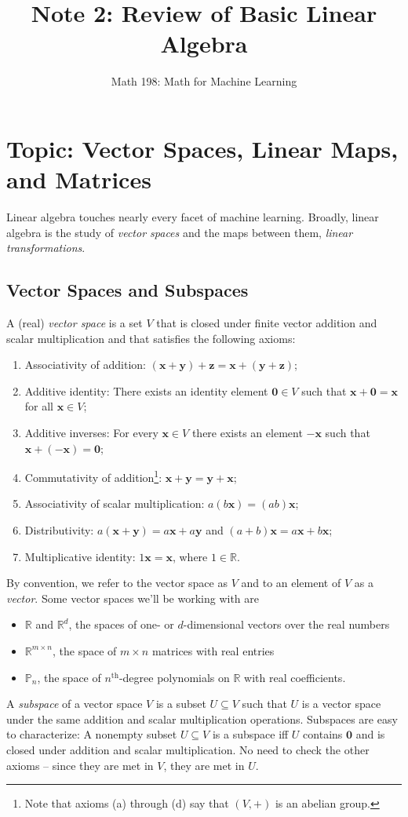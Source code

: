 \documentclass{article}
\title{Note 2: Review of Basic Linear Algebra}
\author{Math 198: Math for Machine Learning}
\date{}
\newcommand{\R}{\mathbb{R}}
\newcommand{\tit}{\textit}
\newcommand{\tbf}{\textbf}
\begin{document}
\maketitle

\section{Topic: Vector Spaces, Linear Maps, and Matrices}
Linear algebra touches nearly every facet of machine learning. Broadly, linear algebra is the study of \textit{vector spaces} and the maps between them, \textit{linear transformations}. 

\subsection{Vector Spaces and Subspaces}
A (real) \textit{vector space} is a set $V$ that is closed under finite vector addition and scalar multiplication and that satisfies the following axioms:
\begin{enumerate}[label=(\alph*)]
\item Associativity of addition: $(\tbf{x}+\tbf{y})+\tbf{z} = \tbf{x}+(\tbf{y}+\tbf{z})$;
\item Additive identity: There exists an identity element $\tbf{0} \in V$ such that $\tbf{x}+\tbf{0} = \tbf{x}$ for all $\tbf{x} \in V$;
\item Additive inverses: For every $\tbf{x} \in V$ there exists an element $-\tbf{x}$ such that $\tbf{x} + (-\tbf{x}) = \tbf{0}$;
\item Commutativity of addition\footnote{Note that axioms (a) through (d) say that $(V, +)$ is an abelian group.}: $\tbf{x}+\tbf{y} = \tbf{y}+\tbf{x}$;
\item Associativity of scalar multiplication: $a(b\tbf{x}) = (ab)\tbf{x}$;
\item Distributivity: $a(\tbf{x}+\tbf{y}) = a\tbf{x} + a\tbf{y}$ and $(a+b)\tbf{x} = a\tbf{x} + b\tbf{x}$;
\item Multiplicative identity: $1\tbf{x} = \tbf{x}$, where $1 \in \mathbb{R}$.
\end{enumerate}
By convention, we refer to the vector space as $V$ and to an element of $V$ as a \tit{vector}. Some vector spaces we'll be working with are
\begin{itemize}
\item $\mathbb{R}$ and $\mathbb{R}^d$, the spaces of one- or $d$-dimensional vectors over the real numbers
\item $\mathbb{R}^{m \times n}$, the space of $m\times n$ matrices with real entries
\item $\mathbb{P}_n$, the space of $n^{\text{th}}$-degree polynomials on $\R$ with real coefficients.
\end{itemize}
A \tit{subspace} of a vector space $V$ is a subset $U \subseteq V$ such that $U$ is a vector space under the same addition and scalar multiplication operations. Subspaces are easy to characterize: A nonempty subset $U \subseteq V$ is a subspace iff $U$ contains $\tbf{0}$ and is closed under addition and scalar multiplication. No need to check the other axioms -- since they are met in $V$, they are met in $U$.
\end{document}
